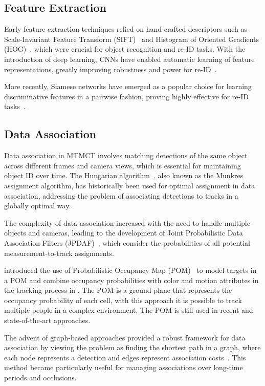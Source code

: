 \subsection{Feature Extraction}\label{subsec:milestone:eature_extraction}
Early feature extraction techniques relied on hand-crafted descriptors such as Scale-Invariant Feature Transform (SIFT)~\cite{Lowe04} and Histogram of Oriented Gradients (HOG)~\cite{Dalal05}, which were crucial for object recognition and re-ID tasks. With the introduction of deep learning, CNNs have enabled automatic learning of feature representations, greatly improving robustness and power for re-ID~\cite{Krizhevsky12, He16}.

More recently, Siamese networks have emerged as a popular choice for learning discriminative features in a pairwise fashion, proving highly effective for re-ID tasks~\cite{Varior16}.

\subsection{Data Association}\label{subsec:milestone_data_association}
Data association in MTMCT involves matching detections of the same object across different frames and camera views, which is essential for maintaining object ID over time. The Hungarian algorithm~\cite{Kuhn55}, also known as the Munkres assignment algorithm, has historically been used for optimal assignment in data association, addressing the problem of associating detections to tracks in a globally optimal way.

The complexity of data association increased with the need to handle multiple objects and cameras, leading to the development of Joint Probabilistic Data Association Filters (JPDAF)~\cite{Fortmann83}, which consider the probabilities of all potential measurement-to-track assignments.

\citeauthor{Fleuret08} introduced the use of Probabilistic Occupancy Map (POM)~\cite{Fleuret08} to model targets in a POM and combine occupancy probabilities with color and motion attributes in the tracking process in \citeyear{Fleuret08}. The POM is a ground plane that represents the occupancy probability of each cell, with this approach it is possible to track multiple people in a complex environment. The POM is still used in recent and state-of-the-art approaches.

The advent of graph-based approaches provided a robust framework for data association by viewing the problem as finding the shortest path in a graph, where each node represents a detection and edges represent association costs~\cite{Zhang08}. This method became particularly useful for managing associations over long-time periods and occlusions.

